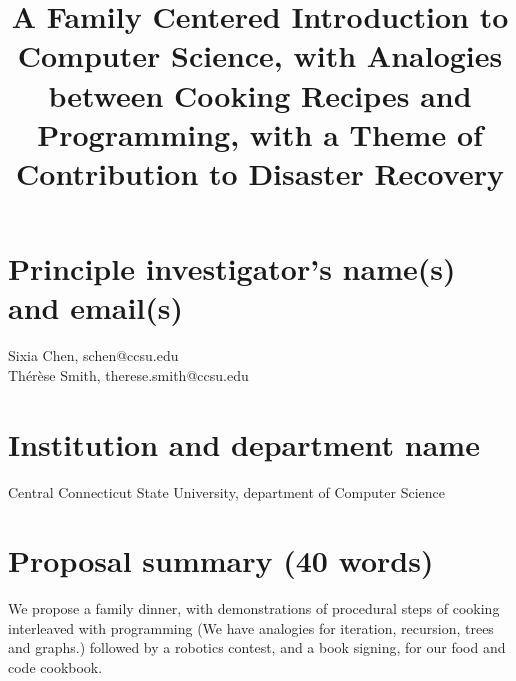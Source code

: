 \documentclass[]{article}
\title{A Family Centered Introduction to Computer Science, with Analogies between Cooking Recipes  and Programming, with a Theme of Contribution to Disaster Recovery}
\author{}
\begin{document}
\maketitle

 

 

\section{Principle investigator’s name(s) and email(s)}
Sixia Chen, schen@ccsu.edu\\
Th\'er\`ese Smith, therese.smith@ccsu.edu
\section{Institution and department name}
Central Connecticut State University, department of Computer Science
\section{Proposal summary (40 words)}
We propose a family dinner, with demonstrations of procedural steps of cooking interleaved with programming (We have analogies for iteration, recursion, trees and graphs.) followed by a robotics contest, and a book signing, for our food and code cookbook.
\end{document}
